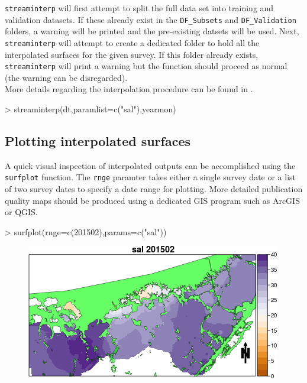 \documentclass[12pt]{article}
\begin{document}
\texttt{streaminterp} will first attempt to split the full data set into training and validation datasets. If these already exist in the \verb|DF_Subsets| and \verb|DF_Validation| folders, a warning will be printed and the pre-existing datsets will be used. Next, \texttt{streaminterp} will attempt to create a dedicated folder to hold all the interpolated surfaces for the given survey. If this folder already exists, \texttt{streaminterp} will print a warning but the function should proceed as normal (the warning can be disregarded).\\

More details regarding the interpolation procedure can be found in \cite{stachelek2015application}.

\begin{Schunk}
\begin{Sinput}
> streaminterp(dt,paramlist=c("sal"),yearmon)
\end{Sinput}
\end{Schunk}

\subsection{Plotting interpolated surfaces}

A quick visual inspection of interpolated outputs can be accomplished using the \texttt{surfplot} function. The \texttt{rnge} paramter takes either a single survey date or a list of two survey dates to specify a date range for plotting. More detailed publication quality maps should be produced using a dedicated GIS program such as ArcGIS or QGIS.

\begin{Schunk}
\begin{Sinput}
> surfplot(rnge=c(201502),params=c("sal"))
\end{Sinput}
\end{Schunk}

\begin{figure}[h!]
\begin{center}
\includegraphics{figure0}
\end{center}
\label{fig:zero}
\end{figure}
\end{document}
